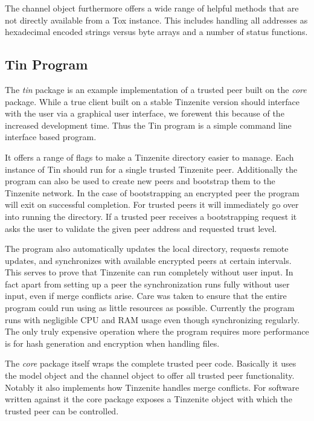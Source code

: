 The channel object furthermore offers a wide range of helpful methods that are not directly available from a Tox instance.
This includes handling all addresses as hexadecimal encoded strings versus byte arrays and a number of status functions.

\subsection{Tin Program}
\label{sub:Tin Program}

The \emph{tin} package is an example implementation of a trusted peer built on the \emph{core} package.
While a true client built on a stable Tinzenite version should interface with the user via a graphical user interface, we forewent this because of the increased development time.
Thus the Tin program is a simple command line interface based program.

It offers a range of flags to make a Tinzenite directory easier to manage.
Each instance of Tin should run for a single trusted Tinzenite peer.
Additionally the program can also be used to create new peers and bootstrap them to the Tinzenite network.
In the case of bootstrapping an encrypted peer the program will exit on successful completion.
For trusted peers it will immediately go over into running the directory.
If a trusted peer receives a bootstrapping request it asks the user to validate the given peer address and requested trust level.

The program also automatically updates the local directory, requests remote updates, and synchronizes with available encrypted peers at certain intervals.
This serves to prove that Tinzenite can run completely without user input.
In fact apart from setting up a peer the synchronization runs fully without user input, even if merge conflicts arise.
Care was taken to ensure that the entire program could run using as little resources as possible.
Currently the program runs with negligible CPU and RAM usage even though synchronizing regularly.
The only truly expensive operation where the program requires more performance is for hash generation and encryption when handling files.

The \emph{core} package itself wraps the complete trusted peer code.
Basically it uses the model object and the channel object to offer all trusted peer functionality.
Notably it also implements how Tinzenite handles merge conflicts.
For software written against it the core package exposes a Tinzenite object with which the trusted peer can be controlled.

